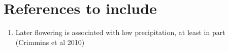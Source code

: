 \documentclass{article}
\begin{document}
\section*{References to include}
\begin{enumerate}
\item Later flowering is  associated with low precipitation, at least in part (Crimmins et al 2010)
\end{enumerate}
\end{document}
